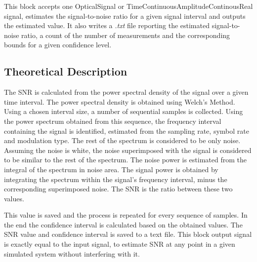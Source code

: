 This block accepts one OpticalSignal or TimeContinuousAmplitudeContinousReal signal, estimates the signal-to-noise ratio for a given signal interval and outputs the estimated value. It also writes a \textit{.txt} file reporting the estimated signal-to-noise ratio, a count of the number of measurements and the corresponding bounds for a given confidence level.

\subsection*{Theoretical Description}\label{snrcalc}
The SNR is calculated from the power spectral density of the signal over a given time interval. The power spectral density is obtained using Welch's Method. Using a chosen interval size, a number of sequential samples is collected. Using the power spectrum obtained from this sequence, the frequency interval containing the signal is identified, estimated from the sampling rate, symbol rate and modulation type. The rest of the spectrum is considered to be only noise.
Assuming the noise is white, the noise superimposed with the signal is considered to be similar to the rest of the spectrum. The noise power is estimated from the integral of the spectrum in noise area. The signal power is obtained by integrating the spectrum within the signal's frequency interval, minus the corresponding superimposed noise. The SNR is the ratio between these two values. 

This value is saved and the process is repeated for every sequence of samples. In the end the confidence interval is calculated based on the obtained values. The SNR value and confidence interval is saved to a text file.
This block output signal is exactly equal to the input signal, to estimate SNR at any point in a given simulated system without interfering with it.


